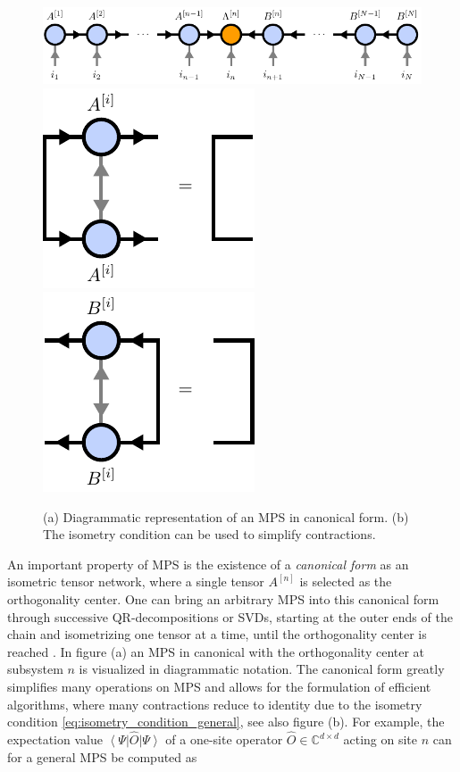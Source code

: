 \begin{figure}
	\centering
	\subcaptionbox{\label{fig:mps_canonical_form_general_definitiom}}
	{%
		\includegraphics[scale=1]{figures/tikz/Tensor_Networks/mps_canonical_form/mps_canonical_form_a.pdf}
	}
	\subcaptionbox{\label{fig:mps_left_isometry_condition}}
	{%
		\includegraphics[scale=1]{figures/tikz/Tensor_Networks/mps_canonical_form/mps_canonical_form_b.pdf}
	}
	\quad\quad\quad\quad\quad\quad
	\subcaptionbox{\label{fig:mps_right_isometry_condition}}
	{%
		\includegraphics[scale=1]{figures/tikz/Tensor_Networks/mps_canonical_form/mps_canonical_form_c.pdf}
	}
	\caption{(a) Diagrammatic representation of an MPS in canonical form. (b) The isometry condition can be used to simplify contractions.}
	\label{fig:mps_canonical}
\end{figure}
An important property of MPS is the existence of a \textit{canonical form} as an isometric tensor network, where a single tensor $A^{[n]}$ is selected as the orthogonality center. One can bring an arbitrary MPS into this canonical form through successive QR-decompositions or SVDs, starting at the outer ends of the chain and isometrizing one tensor at a time, until the orthogonality center is reached \cite{cite:DMRG_in_the_age_of_MPS}. In figure (a) an MPS in canonical with the orthogonality center at subsystem $n$ is visualized in diagrammatic notation. The canonical form greatly simplifies many operations on MPS and allows for the formulation of efficient algorithms, where many contractions reduce to identity due to the isometry condition \eqref{eq:isometry_condition_general}, see also figure (b). For example, the expectation value $\left\langle\Psi\right|\hat{O}\left|\Psi\right\rangle$ of a one-site operator $\hat{O} \in \mathbb{C}^{d\times d}$ acting on site $n$ can for a general MPS be computed as

